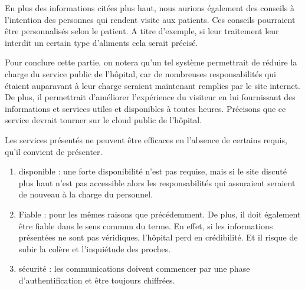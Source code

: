 En plus des informations citées plus haut, nous aurions également des conseils à l'intention des personnes qui rendent visite aux
patients. Ces conseils pourraient être personnalisés selon le patient. A titre d'exemple, si leur traitement leur interdit un certain type d'aliments
cela serait précisé. 
\newline

Pour conclure cette partie, on notera qu'un tel système permettrait de réduire la charge du service public de l'hôpital, car de
nombreuses responsabilités qui étaient auparavant à leur charge seraient maintenant remplies par le site internet. De plus, il permettrait
d'améliorer l'expérience du visiteur en lui fournissant des informations et services utiles et disponibles à toutes heures.
Précisons que ce service devrait tourner sur le cloud public de l'hôpital.
\newline

Les services présentés ne peuvent être efficaces en l'absence de certains requis, qu'il convient de présenter.
\begin{enumerate}
    \item disponible : une forte disponibilité n'est pas requise, mais si le site discuté plus haut n'est pas accessible alors les
    responsabilités qui assuraient seraient de nouveau à la charge du personnel.
    \item Fiable : pour les mêmes raisons que précédemment. De plus, il doit également être fiable dans le sens commun du terme.
    En effet, si les informations présentées ne sont pas véridiques, l'hôpital perd en crédibilité. Et il risque de subir la
    colère et l'inquiétude des proches.
    \item sécurité : les communications doivent commencer par une phase d'authentification et être toujours chiffrées.
 \end{enumerate}
